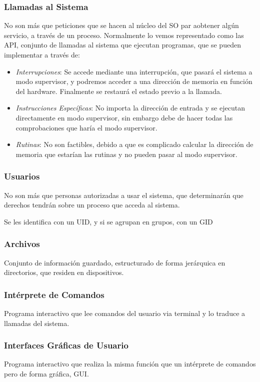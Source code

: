 \subsubsection{Llamadas al Sistema}
\noindent No son más que peticiones que se hacen al núcleo del SO par aobtener algún servicio, a través de un proceso. Normalmente lo vemos representado como las API, conjunto de llamadas al sistema que ejecutan programas, que se pueden implementar a través de:
\begin{itemize}
        \item \textit{Interrupciones}: Se accede mediante una interrupción, que pasará el sistema a modo supervisor, y podremos acceder a una dirección de memoria en función del hardware. Finalmente se restaurá el estado previo a la llamada.
        \item \textit{Instrucciones Específicas}: No importa la dirección de entrada y se ejecutan directamente en modo supervisor, sin embargo debe de hacer todas las comprobaciones que haría el modo supervisor.
        \item \textit{Rutinas}: No son factibles, debido a que es complicado calcular la dirección de memoria que estarían las rutinas y no pueden pasar al modo supervisor.
\end{itemize}
\subsubsection{Usuarios}
\noindent No son más que personas autorizadas a usar el sistema, que determinarán que derechos tendrán sobre un proceso que acceda al sistema.\par \noindent Se les identifica con un UID, y si se agrupan en grupos, con un GID
\subsubsection{Archivos}
\noindent Conjunto de información guardado, estructurado de forma jerárquica en directorios, que residen en dispositivos.
\subsubsection{Intérprete de Comandos}
\noindent Programa interactivo que lee comandos del usuario via terminal y lo traduce a llamadas del sistema.
\subsubsection{Interfaces Gráficas de Usuario}
\noindent Programa interactivo que realiza la misma función que un intérprete de comandos pero de forma gráfica, GUI.
